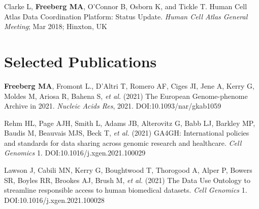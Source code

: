 \documentclass[margin,line]{res}
\begin{document}
\begin{resume}
Clarke L, {\bf Freeberg MA}, O'Connor B, Osborn K, and Tickle T. Human Cell Atlas Data Coordination Platform: Status Update. {\em Human Cell Atlas General Meeting}; Mar 2018; Hinxton, UK




\section{\sc Selected Publications}

{\bf Freeberg MA}, Fromont L., D'Altri T, Romero AF, Ciges JI, Jene A, Kerry G, Moldes M, Ariosa R, Bahena S, {\em et al.} (2021) The European Genome-phenome Archive in 2021. {\em Nucleic Acids Res}, 2021. DOI:10.1093/nar/gkab1059

Rehm HL, Page AJH, Smith L, Adams JB, Alterovitz G, Babb LJ, Barkley MP, Baudis M, Beauvais MJS, Beck T, {\em et al.} (2021) GA4GH: International policies and standards for data sharing across genomic research and healthcare. {\em Cell Genomics} 1. DOI:10.1016/j.xgen.2021.100029

Lawson J, Cabili MN, Kerry G, Boughtwood T, Thorogood A, Alper P, Bowers SR, Boyles RR, Brookes AJ, Brush M, {\em et al.} (2021) The Data Use Ontology to streamline responsible access to human biomedical datasets. {\em Cell Genomics} 1. DOI:10.1016/j.xgen.2021.100028


\end{resume}
\end{document}
